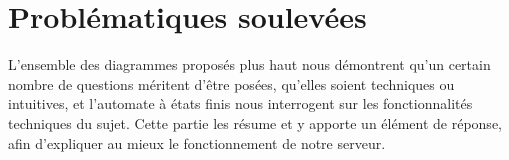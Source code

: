 \chapter{Problématiques soulevées}

L'ensemble des diagrammes proposés plus haut nous démontrent qu'un certain nombre de questions méritent d'être posées, qu'elles soient techniques ou intuitives, et l'automate à états finis nous interrogent sur les fonctionnalités techniques du sujet. Cette partie les résume et y apporte un élément de réponse, afin d'expliquer au mieux le fonctionnement de notre serveur.


